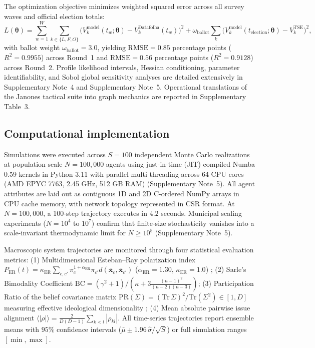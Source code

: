 \documentclass[11pt,a4paper]{article}
\begin{document}
The optimization objective minimizes weighted squared error across all survey waves and official election totals:
\begin{equation}
    L(\boldsymbol{\theta}) = \sum_{w=1}^W \sum_{k \in \{L, F, O\}} \big(V_k^{\mathrm{model}}(t_w; \boldsymbol{\theta}) - V_k^{\mathrm{Datafolha}}(t_w)\big)^2 + \omega_{\mathrm{ballot}} \sum_{k} \big(V_k^{\mathrm{model}}(t_{\mathrm{election}}; \boldsymbol{\theta}) - V_k^{\mathrm{TSE}}\big)^2,
    \label{eq:methods_loss_function}
\end{equation}
with ballot weight $\omega_{\mathrm{ballot}} = 3.0$, yielding $\mathrm{RMSE} = 0.85$ percentage points ($R^2 = 0.9955$) across Round~1 and $\mathrm{RMSE} = 0.56$ percentage points ($R^2 = 0.9128$) across Round~2. Profile likelihood intervals, Hessian conditioning, parameter identifiability, and Sobol global sensitivity analyses are detailed extensively in Supplementary Note~4 and Supplementary Note~5. Operational translations of the Janones tactical suite into graph mechanics are reported in Supplementary Table~3.

\subsection*{Computational implementation}
Simulations were executed across $S = 100$ independent Monte Carlo realizations at population scale $N = 100{,}000$ agents using just-in-time (JIT) compiled Numba 0.59 kernels in Python 3.11 with parallel multi-threading across 64 CPU cores (AMD EPYC 7763, 2.45 GHz, 512 GB RAM) (Supplementary Note~5). All agent attributes are laid out as contiguous 1D and 2D C-ordered NumPy arrays in CPU cache memory, with network topology represented in CSR format. At $N = 100{,}000$, a 100-step trajectory executes in $4.2$ seconds. Municipal scaling experiments ($N = 10^4$ to $10^7$) confirm that finite-size stochasticity vanishes into a scale-invariant thermodynamic limit for $N \ge 10^5$ (Supplementary Note~5).

Macroscopic system trajectories are monitored through four statistical evaluation metrics:
(1) Multidimensional Esteban--Ray polarization index $P_{\mathrm{ER}}(t) = \kappa_{\mathrm{ER}} \sum_{c, c'} \pi_c^{1 + \alpha_{\mathrm{ER}}} \pi_{c'} d(\bar{\mathbf{x}}_c, \bar{\mathbf{x}}_{c'})$ ($\alpha_{\mathrm{ER}} = 1.30$, $\kappa_{\mathrm{ER}} = 1.0$) \citep{esteban1994measurement};
(2) Sarle's Bimodality Coefficient $\mathrm{BC} = (\gamma^2 + 1) / (\kappa + 3 \frac{(n-1)^2}{(n-2)(n-3)})$;
(3) Participation Ratio of the belief covariance matrix $\mathrm{PR}(\Sigma) = (\mathrm{Tr}\,\Sigma)^2 / \mathrm{Tr}(\Sigma^2) \in [1, D]$ measuring effective ideological dimensionality \citep{roy1953useful};
(4) Mean absolute pairwise issue alignment $\langle |\rho| \rangle = \frac{2}{D(D-1)} \sum_{k < l} |\rho_{kl}|$. All time-series trajectories report ensemble means with $95\%$ confidence intervals ($\bar{\mu} \pm 1.96\,\hat{\sigma}/\sqrt{S}$) or full simulation ranges $[\min, \max]$.
\end{document}

